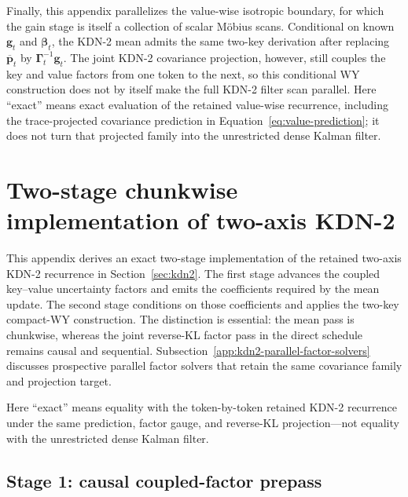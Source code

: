 \documentclass[11pt]{article}
\newcommand{\ve}[1]{\boldsymbol{#1}}
\begin{document}
Finally, this appendix parallelizes the value-wise isotropic boundary, for which the gain stage is
itself a collection of scalar M\"obius scans.  Conditional on known $\ve{g}_t$ and
$\ve{\beta}_t$, the KDN-2 mean admits the same two-key derivation after replacing
$\overline{\ve{p}}_t$ by $\ve{\Gamma}_t^{-1}\ve{g}_t$.  The joint KDN-2 covariance projection,
however, still couples the key and value factors from one token to the next, so this conditional
WY construction does not by itself make the full KDN-2 filter scan parallel.  Here ``exact'' means
exact evaluation of the retained value-wise recurrence, including the trace-projected covariance
prediction in Equation~\eqref{eq:value-prediction}; it does not turn that projected family into the
unrestricted dense Kalman filter.

\section{Two-stage chunkwise implementation of two-axis KDN-2}
\label{app:kdn2-chunkwise}

This appendix derives an exact two-stage implementation of the retained two-axis KDN-2 recurrence
in Section~\ref{sec:kdn2}.  The first stage advances the coupled key--value uncertainty factors and
emits the coefficients required by the mean update.  The second stage conditions on those
coefficients and applies the two-key compact-WY construction.  The distinction is essential: the
mean pass is chunkwise, whereas the joint reverse-KL factor pass in the direct schedule remains
causal and sequential.  Subsection~\ref{app:kdn2-parallel-factor-solvers} discusses prospective
parallel factor solvers that retain the same covariance family and projection target.

Here ``exact'' means equality with the token-by-token retained KDN-2 recurrence under the same
prediction, factor gauge, and reverse-KL projection---not equality with the unrestricted dense
Kalman filter.

\subsection{Stage 1: causal coupled-factor prepass}
\label{app:kdn2-factor-pass}
\end{document}
